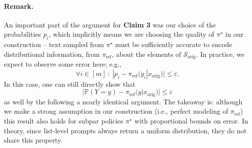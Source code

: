 \paragraph{Remark.} An important part of the argument for \textbf{Claim 3} was our choice of the probabilities $p_i$, which implicitly means we are choosing the quality of $\pi^\star$ in our construction -- text sampled from $\pi^\star$ must be sufficiently accurate to encode distributional information, from $\pi_\text{ref}$, about the elements of $\mathcal{S}_\text{orig}$. In practice, we expect to observe some error here; e.g.,
\begin{equation}
    \forall i \in [m] \ : \ |p_i -  \pi_\text{ref}(y_i | x_\text{orig})| \leq \varepsilon.
\end{equation}
In this case, one can still directly show that 
\begin{equation}
    |\mathbb{P}(Y = y) - \pi_\text{ref}(y | x_\text{orig})| \leq \varepsilon
\end{equation}
as well by the following a nearly identical argument. The takeaway is: although we make a strong assumption in our construction (i.e., perfect modeling of $\pi_\text{ref}$) this result also holds for subpar policies $\pi^\star$ with proportional bounds on error. In theory, since list-level prompts always return a uniform distribution, they do not share this property.

